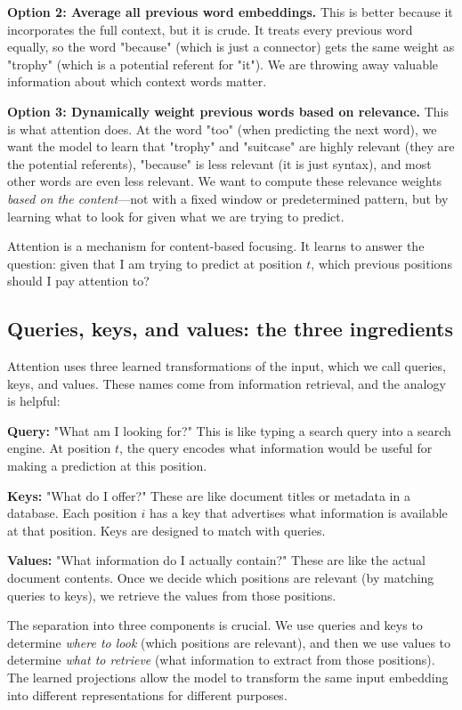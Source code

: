 \textbf{Option 2: Average all previous word embeddings.} This is better because it incorporates the full context, but it is crude. It treats every previous word equally, so the word "because" (which is just a connector) gets the same weight as "trophy" (which is a potential referent for "it"). We are throwing away valuable information about which context words matter.

\textbf{Option 3: Dynamically weight previous words based on relevance.} This is what attention does. At the word "too" (when predicting the next word), we want the model to learn that "trophy" and "suitcase" are highly relevant (they are the potential referents), "because" is less relevant (it is just syntax), and most other words are even less relevant. We want to compute these relevance weights \emph{based on the content}---not with a fixed window or predetermined pattern, but by learning what to look for given what we are trying to predict.

Attention is a mechanism for content-based focusing. It learns to answer the question: given that I am trying to predict at position $t$, which previous positions should I pay attention to?

\subsection{Queries, keys, and values: the three ingredients}
\label{sec:qkv_intuition}

Attention uses three learned transformations of the input, which we call queries, keys, and values. These names come from information retrieval, and the analogy is helpful:

\textbf{Query:} "What am I looking for?" This is like typing a search query into a search engine. At position $t$, the query encodes what information would be useful for making a prediction at this position.

\textbf{Keys:} "What do I offer?" These are like document titles or metadata in a database. Each position $i$ has a key that advertises what information is available at that position. Keys are designed to match with queries.

\textbf{Values:} "What information do I actually contain?" These are like the actual document contents. Once we decide which positions are relevant (by matching queries to keys), we retrieve the values from those positions.

The separation into three components is crucial. We use queries and keys to determine \emph{where to look} (which positions are relevant), and then we use values to determine \emph{what to retrieve} (what information to extract from those positions). The learned projections allow the model to transform the same input embedding into different representations for different purposes.

